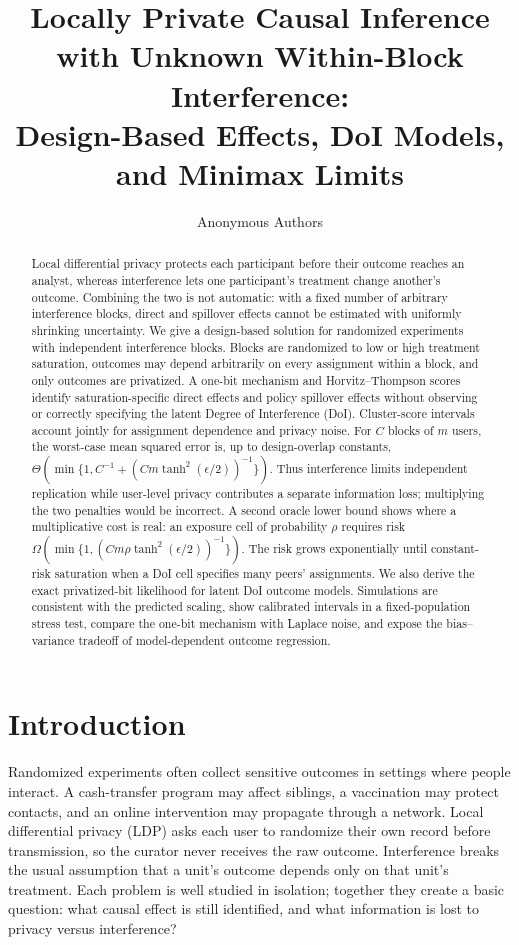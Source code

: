 \documentclass[11pt]{article}
\title{Locally Private Causal Inference with Unknown Within-Block Interference:\\
Design-Based Effects, DoI Models, and Minimax Limits}
\author{Anonymous Authors}
\date{}
\theoremstyle{definition}
\theoremstyle{remark}
\begin{document}
\maketitle

\begin{abstract}
Local differential privacy protects each participant before their outcome reaches an analyst,
whereas interference lets one participant's treatment change another's outcome. Combining the
two is not automatic: with a fixed number of arbitrary interference blocks, direct and
spillover effects cannot be estimated with uniformly shrinking uncertainty. We give a
design-based solution for randomized
experiments with independent interference blocks. Blocks are randomized to low or high
treatment saturation, outcomes may depend arbitrarily on every assignment within a block,
and only outcomes are privatized. A one-bit mechanism and Horvitz--Thompson scores identify
saturation-specific direct effects and policy spillover effects without observing or correctly
specifying the latent Degree of Interference (DoI). Cluster-score intervals account jointly for
assignment dependence and privacy noise. For $C$ blocks of $m$ users, the worst-case mean
squared error is, up to design-overlap constants,
$\Theta\!\left(\min\{1,C^{-1}+(Cm\tanh^2(\epsilon/2))^{-1}\}\right)$.
Thus interference limits independent replication while user-level privacy contributes a
separate information loss; multiplying the two penalties would be incorrect. A second oracle
lower bound shows where a multiplicative cost is real: an exposure cell of probability $\rho$
requires risk $\Omega(\min\{1,(Cm\rho\tanh^2(\epsilon/2))^{-1}\})$. The risk grows
exponentially until constant-risk saturation when a DoI cell specifies many peers'
assignments. We also derive the exact privatized-bit likelihood for latent DoI outcome models.
Simulations are consistent with the predicted scaling, show calibrated intervals in a
fixed-population stress test, compare the one-bit mechanism with Laplace noise, and expose the
bias--variance tradeoff of model-dependent outcome regression.
\end{abstract}

\section{Introduction}

Randomized experiments often collect sensitive outcomes in settings where people interact.
A cash-transfer program may affect siblings, a vaccination may protect contacts, and an online
intervention may propagate through a network. Local differential privacy (LDP) asks each user
to randomize their own record before transmission, so the curator never receives the raw
outcome. Interference breaks the usual assumption that a unit's outcome depends only on that
unit's treatment. Each problem is well studied in isolation; together they create a basic
question: what causal effect is still identified, and what information is lost to privacy versus
interference?
\end{document}
